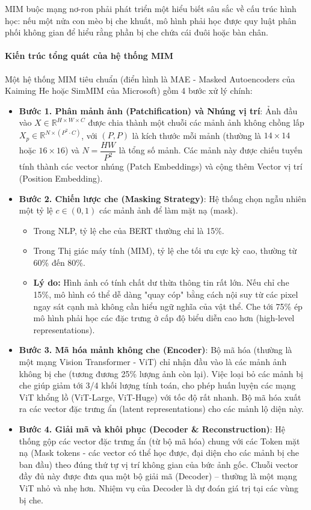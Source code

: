 MIM buộc mạng nơ-ron phải phát triển một hiểu biết sâu sắc về cấu trúc hình học: nếu một nửa con mèo bị che khuất, mô hình phải học được quy luật phân phối không gian để hiểu rằng phần bị che chứa cái đuôi hoặc bàn chân.
\paragraph{Kiến trúc tổng quát của hệ thống MIM}
Một hệ thống MIM tiêu chuẩn (điển hình là MAE - Masked Autoencoders của Kaiming He hoặc SimMIM của Microsoft) gồm 4 bước xử lý chính:
\begin{itemize}
    \item \textbf{Bước 1. Phân mảnh ảnh (Patchification) và Nhúng vị trí}: Ảnh đầu vào $X \in \mathbb{R}^{H \times W \times C}$ được chia thành một chuỗi các mảnh ảnh không chồng lấp $X_p \in \mathbb{R}^{N \times (P^2 \cdot C)}$, với $(P, P)$ là kích thước mỗi mảnh (thường là $14 \times 14$ hoặc $16 \times 16$) và $N = \dfrac{HW}{P^2}$ là tổng số mảnh. Các mảnh này được chiếu tuyến tính thành các vector nhúng (Patch Embeddings) và cộng thêm Vector vị trí (Position Embedding).
    \item \textbf{Bước 2. Chiến lược che (Masking Strategy)}: Hệ thống chọn ngẫu nhiên một tỷ lệ $c \in (0, 1)$ các mảnh ảnh để làm mặt nạ (mask).
    \begin{itemize}
        \item Trong NLP, tỷ lệ che của BERT thường chỉ là 15\%.
        \item Trong Thị giác máy tính (MIM), tỷ lệ che tối ưu cực kỳ cao, thường từ 60\% đến 80\%.
        \item \textbf{Lý do:} Hình ảnh có tính chất dư thừa thông tin rất lớn. Nếu chỉ che 15\%, mô hình có thể dễ dàng "quay cóp" bằng cách nội suy từ các pixel ngay sát cạnh mà không cần hiểu ngữ nghĩa của vật thể. Che tới 75\% ép mô hình phải học các đặc trưng ở cấp độ biểu diễn cao hơn (high-level representations).
    \end{itemize}
    \item \textbf{Bước 3. Mã hóa mảnh không che (Encoder)}: Bộ mã hóa (thường là một mạng Vision Transformer - ViT) chỉ nhận đầu vào là các mảnh ảnh không bị che (tương đương 25\% lượng ảnh còn lại). Việc loại bỏ các mảnh bị che giúp giảm tới 3/4 khối lượng tính toán, cho phép huấn luyện các mạng ViT khổng lồ (ViT-Large, ViT-Huge) với tốc độ rất nhanh. Bộ mã hóa xuất ra các vector đặc trưng ẩn (latent representations) cho các mảnh lộ diện này.
    \item \textbf{Bước 4. Giải mã và khôi phục (Decoder \& Reconstruction)}: Hệ thống gộp các vector đặc trưng ẩn (từ bộ mã hóa) chung với các Token mặt nạ (Mask tokens - các vector có thể học được, đại diện cho các mảnh bị che ban đầu) theo đúng thứ tự vị trí không gian của bức ảnh gốc. Chuỗi vector đầy đủ này được đưa qua một bộ giải mã (Decoder) – thường là một mạng ViT nhỏ và nhẹ hơn. Nhiệm vụ của Decoder là dự đoán giá trị tại các vùng bị che.
\end{itemize}
